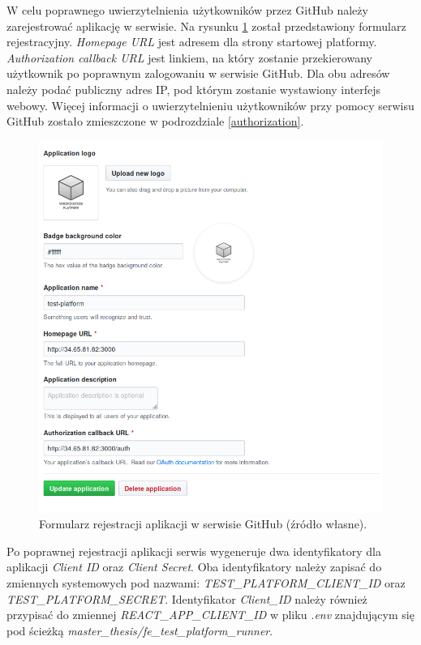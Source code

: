 W celu poprawnego uwierzytelnienia użytkowników przez GitHub należy zarejestrować aplikację w serwisie.
Na rysunku \ref{fig:github_app_register} został przedstawiony formularz rejestracyjny.
\textit{Homepage URL} jest adresem dla strony startowej platformy.
\textit{Authorization callback URL} jest linkiem, na który zostanie przekierowany użytkownik po poprawnym zalogowaniu w serwisie GitHub.
Dla obu adresów należy podać publiczny adres IP, pod którym zostanie wystawiony interfejs webowy.
Więcej informacji o uwierzytelnieniu użytkowników przy pomocy serwisu GitHub zostało zmieszczone w podrozdziale \ref{authorization}.

\begin{figure}[h]
    \centering
    \includegraphics[width = 12cm]{chapter05/github_app_register.png}
    \caption{Formularz rejestracji aplikacji w serwisie GitHub (źródło własne).}
    \label{fig:github_app_register}
\end{figure}

Po poprawnej rejestracji aplikacji serwis wygeneruje dwa identyfikatory dla aplikacji \textit{Client ID} oraz \textit{Client Secret}.
Oba identyfikatory należy zapisać do zmiennych systemowych pod nazwami: \textit{TEST\_PLATFORM\_CLIENT\_ID} oraz \textit{TEST\_PLATFORM\_SECRET}.
Identyfikator \textit{Client\_ID} należy również przypisać do zmiennej \textit{REACT\_APP\_CLIENT\_ID} w pliku \textit{.env} znajdującym się pod ścieżką \textit{master\_thesis/fe\_test\_platform\_runner}.

